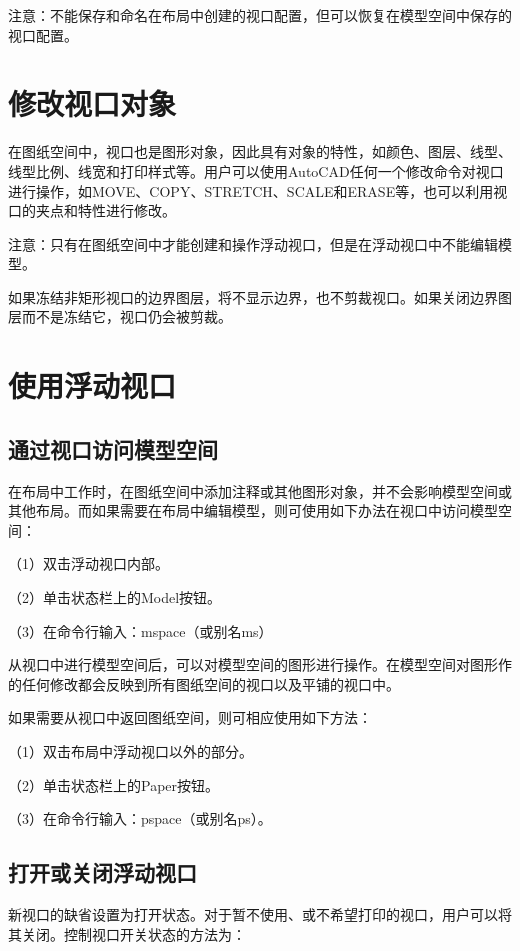 注意：不能保存和命名在布局中创建的视口配置，但可以恢复在模型空间中保存的视口配置。



\section{修改视口对象}

在图纸空间中，视口也是图形对象，因此具有对象的特性，如颜色、图层、线型、线型比例、线宽和打印样式等。用户可以使用AutoCAD任何一个修改命令对视口进行操作，如MOVE、COPY、STRETCH、SCALE和ERASE等，也可以利用视口的夹点和特性进行修改。

注意：只有在图纸空间中才能创建和操作浮动视口，但是在浮动视口中不能编辑模型。

如果冻结非矩形视口的边界图层，将不显示边界，也不剪裁视口。如果关闭边界图层而不是冻结它，视口仍会被剪裁。


\section{使用浮动视口}


\subsection{通过视口访问模型空间}


在布局中工作时，在图纸空间中添加注释或其他图形对象，并不会影响模型空间或其他布局。而如果需要在布局中编辑模型，则可使用如下办法在视口中访问模型空间：

（1）双击浮动视口内部。

（2）单击状态栏上的Model按钮。

（3）在命令行输入：mspace（或别名ms）

从视口中进行模型空间后，可以对模型空间的图形进行操作。在模型空间对图形作的任何修改都会反映到所有图纸空间的视口以及平铺的视口中。

如果需要从视口中返回图纸空间，则可相应使用如下方法：

（1）双击布局中浮动视口以外的部分。

（2）单击状态栏上的Paper按钮。

（3）在命令行输入：pspace（或别名ps）。



\subsection{打开或关闭浮动视口}

新视口的缺省设置为打开状态。对于暂不使用、或不希望打印的视口，用户可以将其关闭。控制视口开关状态的方法为：

